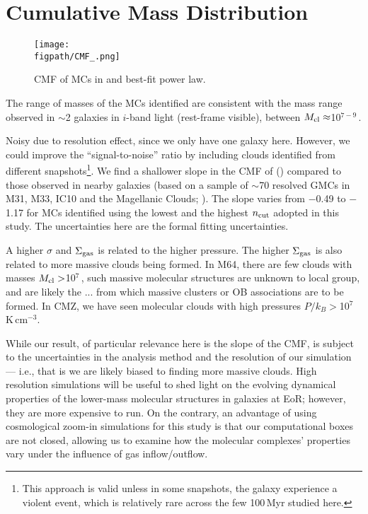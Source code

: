 \documentclass[apj]{emulateapj} %
\begin{document}
{\section{Cumulative Mass Distribution}   \label{sec:cmf}

\begin{figure*}[htbp]
\centering
\texttt{[image: \\figpath/CMF\_.png]}
\caption{
CMF of MCs in \flower and best-fit power law.
\label{fig:cmf}}
\end{figure*}

The range of masses of the MCs identified are consistent with the mass range observed in \z$\sim$2 galaxies in $i$-band light (rest-frame visible),
between $M_{\rm cl}\approx$10$^{7-9}$\,\Msun \citep{Elmegreen07a, Elmegreen09a}.

Noisy due to resolution effect, since we only have one galaxy here. However,
we could improve the ``signal-to-noise'' ratio by including clouds identified from different
snapshots\footnote{This approach is valid unless in some snapshots,
the galaxy experience a violent event, which is relatively rare across the few 100\,Myr studied here.}.
We find a shallower slope in the CMF of \flower ()
compared to those observed in nearby galaxies (based on a sample of
$\sim$70 resolved GMCs in M31, M33, IC10 and the Magellanic Clouds; \citealt{Blitz07a}).
The slope varies from $-$0.49 to $-$1.17 for MCs identified using the lowest and the
highest $n_{\rm cut}$ adopted in this study.
The uncertainties here are the formal fitting uncertainties.

A higher $\sigma$ and $\Sigma_{\rm gas}$ is related to the higher
pressure. The higher $\Sigma_{\rm gas}$ is also related to more massive clouds being formed.
In M64, there are few clouds with masses $M_{\rm cl}>$10$^7$\,\Msun, such massive molecular
structures are unknown to local group, and are likely the ... from which massive clusters or OB associations are to be formed.
In CMZ, we have seen molecular clouds with high pressures $P/k_B > $10$^7$\,K\,cm$^{-3}$.

While our result, of particular relevance here is the slope of the CMF, is subject
to the uncertainties in the analysis method and the resolution of our simulation --- i.e., that is
we are likely biased to finding more massive clouds.
High resolution simulations will be useful to shed light on
the evolving dynamical properties of the lower-mass molecular structures in
galaxies at EoR; however, they are more expensive to run.
On the contrary, an advantage of using cosmological zoom-in simulations for this study
is that our computational boxes are not closed, allowing us to examine how
the molecular complexes' properties vary under the influence of gas inflow/outflow.




}
\end{document}
